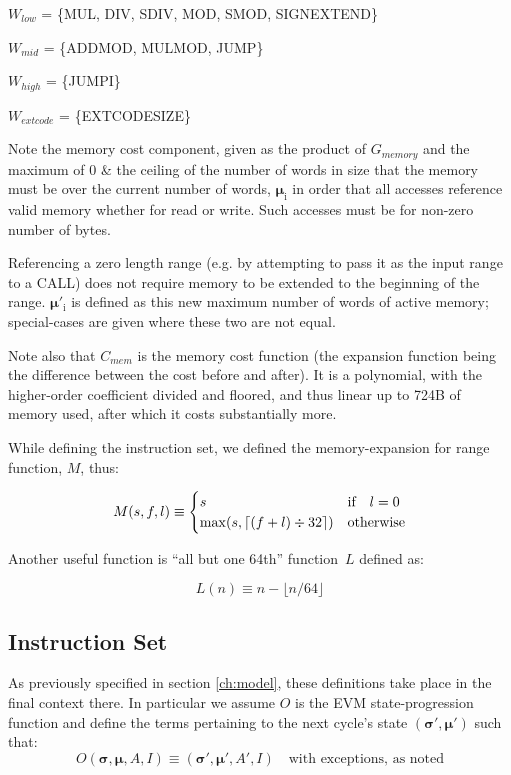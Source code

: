 \documentclass[9pt,oneside]{amsart}
\DeclarePairedDelimiter{\ceil}{\lceil}{\rceil}
\begin{document}
$W_{low}$ = \{{\small MUL}, {\small DIV}, {\small SDIV}, {\small MOD}, {\small SMOD}, {\small SIGNEXTEND}\}

$W_{mid}$ = \{{\small ADDMOD}, {\small MULMOD}, {\small JUMP}\}

$W_{high}$ = \{{\small JUMPI}\}

$W_{extcode}$ = \{{\small EXTCODESIZE}\}

Note the memory cost component, given as the product of $G_{memory}$ and the maximum of 0 \& the ceiling of the number of words in size that the memory must be over the current number of words, $\boldsymbol{\mu}_{\mathrm{i}}$ in order that all accesses reference valid memory whether for read or write. Such accesses must be for non-zero number of bytes.

Referencing a zero length range (e.g. by attempting to pass it as the input range to a CALL) does not require memory to be extended to the beginning of the range. $\boldsymbol{\mu}'_{\mathrm{i}}$ is defined as this new maximum number of words of active memory; special-cases are given where these two are not equal.

Note also that $C_{mem}$ is the memory cost function (the expansion function being the difference between the cost before and after). It is a polynomial, with the higher-order coefficient divided and floored, and thus linear up to 724B of memory used, after which it costs substantially more.

While defining the instruction set, we defined the memory-expansion for range function, $M$, thus:

\begin{equation}
M(s, f, l) \equiv \begin{cases}
s & \text{if} \quad l = 0 \\
\max(s, \ceil{ (f + l) \div 32 }) & \text{otherwise}
\end{cases}
\end{equation}

Another useful function is ``all but one 64th'' function~$L$ defined as:

\begin{equation}
L(n) \equiv n - \lfloor n / 64 \rfloor
\end{equation}

\subsection{Instruction Set}

As previously specified in section \ref{ch:model}, these definitions take place in the final context there. In particular we assume $O$ is the EVM state-progression function and define the terms pertaining to the next cycle's state $(\boldsymbol{\sigma}', \boldsymbol{\mu}')$ such that:
\begin{equation}
O(\boldsymbol{\sigma}, \boldsymbol{\mu}, A, I) \equiv (\boldsymbol{\sigma}', \boldsymbol{\mu}', A', I) \quad \text{with exceptions, as noted}
\end{equation}
\end{document}
